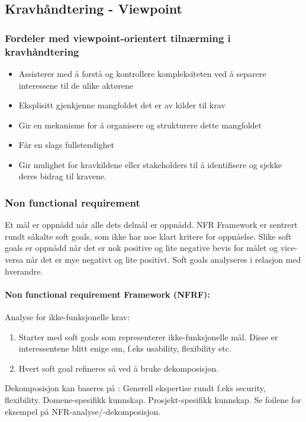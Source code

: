 \subsection{Kravhåndtering - Viewpoint}

\subsubsection{Fordeler med viewpoint-orientert tilnærming i
kravhåndtering}

\begin{itemize}
\item
  Assisterer med å forstå og kontrollere kompleksiteten ved å separere
  interessene til de ulike aktørene
\item
  Eksplisitt gjenkjenne mangfoldet det er av kilder til krav
\item
  Gir en mekanisme for å organisere og strukturere dette mangfoldet
\item
  Får en slags fullstendighet
\item
  Gir mulighet for kravkildene eller stakeholders til å identifisere og
  sjekke deres bidrag til kravene.
\end{itemize}
\subsubsection{Non functional requirement}

Et mål er oppnådd når alle dets delmål er oppnådd. NFR Framework er
sentrert rundt såkalte soft goals, som ikke har noe klart kritere for
oppnåelse. Slike soft goals er oppnådd når det er nok positive og lite
negative bevis for målet og vice-versa når det er mye negativt og lite
positivt. Soft goals analyseres i relasjon med hverandre.

\paragraph{Non functional requirement Framework (NFRF):}

Analyse for ikke-funksjonelle krav:

\begin{enumerate}[1.]
\item
  Starter med soft goals som representerer ikke-funksjonelle mål. Disse
  er interessentene blitt enige om, f.eks usability, flexibility etc.
\item
  Hvert soft goal refineres så ved å bruke dekomposisjon.
\end{enumerate}
Dekomposisjon kan baseres på : Generell ekspertise rundt f.eks security,
flexibility. Domene-spesifikk kunnskap. Prosjekt-spesifikk kunnskap. Se
foilene for eksempel på NFR-analyse/-dekomposisjon.

